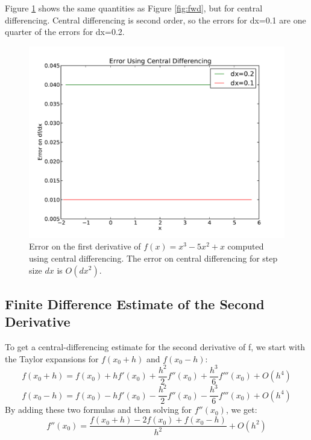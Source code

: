 \documentclass{article}
\begin{document}
Figure \ref{fig:cen} shows the same quantities as Figure \ref{fig:fwd}, but
for central differencing.  Central differencing is second order, so the
errors for dx=0.1 are one quarter of the errors for dx=0.2.
\begin{figure}[h]
  \begin{center}
     \includegraphics[width=\textwidth]{cen}
  \end{center}
  \caption{Error on the first derivative of $f(x)=x^3-5x^2+x$ computed
	   using central differencing. The error on central differencing
	   for step size $dx$ is $O(dx^2)$.}
  \label{fig:cen}
\end{figure}

\subsection{Finite Difference Estimate of the Second Derivative}
To get a central-differencing estimate for the second derivative of f, we start with
the Taylor expansions for $f(x_0+h)$ and $f(x_0-h)$:
\begin{equation}
	f(x_0+h) = f(x_0) + h f'(x_0) + \frac{h^2}{2} f''(x_0) + \frac{h^3}{6}f'''(x_0) + O(h^4)
\end{equation}
\begin{equation}
	f(x_0-h) = f(x_0) - h f'(x_0) - \frac{h^2}{2} f''(x_0) - \frac{h^3}{6}f'''(x_0) + O(h^4)
\end{equation}
By adding these two formulas and then solving for $f''(x_0)$, we get:
\begin{equation}
	f''(x_0) = \frac{f(x_0+h) - 2 f(x_0) + f(x_0-h)}{h^2} + O(h^2)
\end{equation}
\end{document}
